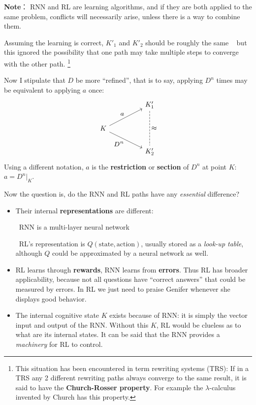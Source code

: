 \documentclass[12pt]{article}
\newcommand{\dashh}{\textemdash~}
\begin{document}
\textbf{Note}： RNN and RL are learning algorithms, and if they are both applied to the same problem, conflicts will necessarily arise, unless there is a way to combine them.

Assuming the learning is correct, $K'_1$ and $K'_2$ should be roughly the same \textemdash~ but this ignored the possibility that one path may take multiple steps to converge with the other path.  \footnote{This situation has been encountered in term rewriting systems (TRS):  If in a TRS any 2 different rewriting paths always converge to the same result, it is said to have the \textbf{Church-Rosser property}.  For example the $\lambda$-calculus invented by Church has this property.} 

Now I stipulate that $D$ be more ``refined'', that is to say, applying $D^n$ times may be equivalent to applying $a$ once:
\begin{equation}
\begin{tikzcd}[column sep=huge]
& K'_1 \arrow[dd, dashed, no head, "\scalebox{1.3}{$\approx$}"] \\
K \arrow[ur, "\scalebox{1.3}{$a$}"] \arrow[dr, "{\scalebox{1.3}{$D^n$}}"'] & \\
& K'_2
\end{tikzcd}
\end{equation}
Using a different notation, $a$ is the \textbf{restriction} or \textbf{section} of $D^n$ at point $K$: $a = D^n|_K$.

Now the question is, do the RNN and RL paths have any \textit{essential} difference?
\begin{itemize}
\item Their internal \textbf{representations} are different:\par
\dashh RNN is a multi-layer neural network\par
\dashh RL's representation is $Q(\mbox{state},\mbox{action})$, usually stored as a \textit{look-up table}, although $Q$ could be approximated by a neural network as well.
\item RL learns through \textbf{rewards}, RNN learns from \textbf{errors}.  Thus RL has broader applicability, because not all questions have ``correct answers'' that could be measured by errors.  In RL we just need to praise Genifer whenever she displays good behavior.
\item The internal cognitive state $K$ exists because of RNN:  it is simply the vector input and output of the RNN.  Without this $K$, RL would be clueless as to what are its internal states.  It can be said that the RNN provides a \textit{machinery} for RL to control.
\end{itemize}
\end{document}
